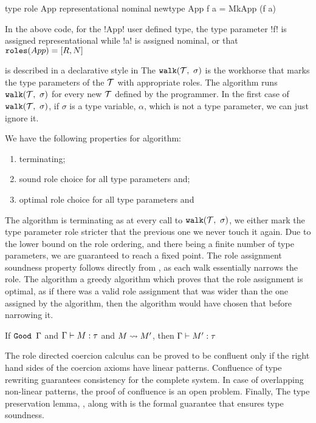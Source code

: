 \documentclass[screen,nonacm,manuscript,review]{acmart} %
\begin{document}
\begin{CenteredBox}
\begin{code}
type role App representational nominal
newtype App f a = MkApp (f a)
\end{code}
\end{CenteredBox}
In the above code, for the !App! user defined type, the type parameter !f! is assigned representational while !a! is assigned nominal, or that $\texttt{roles}(App) = [R, N]$

\RoleInfer is described in a declarative style in 
The $\texttt{walk}(\mathcal{T},~\sigma)$ is the workhorse that marks the type parameters of the $\mathcal{T}$ with appropriate roles. The algorithm \RoleInfer runs $\texttt{walk}(\mathcal{T},~\sigma)$ for every new $\mathcal{T}$ defined by the programmer. In the first case of $\texttt{walk}(\mathcal{T},~\sigma)$, if $\sigma$ is a type variable, $\alpha$, which is not a type parameter, we can just ignore it.

We have the following properties for \RoleInfer algorithm:
\begin{enumerate}
\item terminating;
\item sound role choice for all type parameters and;
\item optimal role choice for all type parameters and
\end{enumerate}

The algorithm is terminating as at every call to $\texttt{walk}(\mathcal{T},~\sigma)$, we either mark the type parameter role stricter that the previous one we never touch it again. Due to the lower bound on the role ordering, and there being a finite number of type parameters, we are guaranteed to reach a fixed point. The role assignment soundness property follows directly from , as each walk essentially narrows the role. The algorithm a greedy algorithm which proves that the role assignment is optimal, as if there was a valid role assignment that was wider than the one assigned by the algorithm, then the algorithm would have chosen that before narrowing it.

\begin{lemma}\label{lem:sfr-preservation}
If $\texttt{Good~}\Gamma$ and $\Gamma \vdash M : \tau$ and $M \rightsquigarrow M'$, then $\Gamma \vdash M' : \tau$
\end{lemma}
The role directed coercion calculus can be proved to be confluent only if the right hand sides of the coercion axioms have linear patterns. Confluence of type rewriting guarantees consistency for the complete system. In case of overlapping non-linear patterns, the proof of confluence is an open problem\cite{mizuhito_rta_1995}.
Finally, The type preservation lemma, ,
along with  is the formal guarantee that
ensures type soundness.
\end{document}
